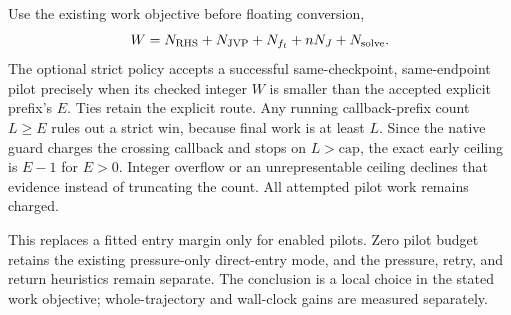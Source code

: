 Use the existing work objective before floating conversion,
\begin{equation}
 W=N_{\rm RHS}+N_{\rm JVP}+N_{f_t}+nN_J+N_{\rm solve}.
\end{equation}
The optional strict policy accepts a successful same-checkpoint,
same-endpoint pilot precisely when its checked integer $W$ is smaller
than the accepted explicit prefix's $E$. Ties retain the explicit route.
Any running callback-prefix count $L\ge E$ rules out a strict win,
because final work is at least $L$. Since the native guard charges the
crossing callback and stops on $L>\mathrm{cap}$, the exact early ceiling
is $E-1$ for $E>0$. Integer overflow or an unrepresentable ceiling
declines that evidence instead of truncating the count. All attempted
pilot work remains charged.

This replaces a fitted entry margin only for enabled pilots. Zero pilot
budget retains the existing pressure-only direct-entry mode, and the
pressure, retry, and return heuristics remain separate. The conclusion
is a local choice in the stated work objective; whole-trajectory and
wall-clock gains are measured separately.
